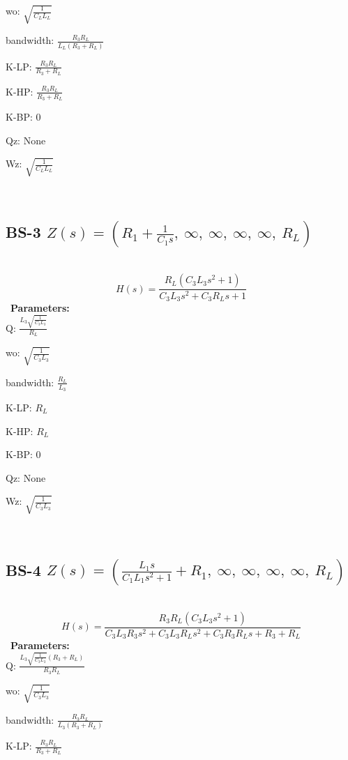 \documentclass{article}
\begin{document}
wo: $\sqrt{\frac{1}{C_{L} L_{L}}}$\ 

bandwidth: $\frac{R_{3} R_{L}}{L_{L} \left(R_{3} + R_{L}\right)}$\ 

K-LP: $\frac{R_{3} R_{L}}{R_{3} + R_{L}}$\ 

K-HP: $\frac{R_{3} R_{L}}{R_{3} + R_{L}}$\ 

K-BP: $0$\ 

Qz: $\text{None}$\ 

Wz: $\sqrt{\frac{1}{C_{L} L_{L}}}$\ 

\ 

\subsection{BS-3 $Z(s) = \left( R_{1} + \frac{1}{C_{1} s}, \  \infty, \  \infty, \  \infty, \  \infty, \  R_{L}\right)$ } \ 
\textbf{\[H(s) = \frac{R_{L} \left(C_{3} L_{3} s^{2} + 1\right)}{C_{3} L_{3} s^{2} + C_{3} R_{L} s + 1}\] } \ 
\textbf{Parameters:}\\ 

Q: $\frac{L_{3} \sqrt{\frac{1}{C_{3} L_{3}}}}{R_{L}}$\ 

wo: $\sqrt{\frac{1}{C_{3} L_{3}}}$\ 

bandwidth: $\frac{R_{L}}{L_{3}}$\ 

K-LP: $R_{L}$\ 

K-HP: $R_{L}$\ 

K-BP: $0$\ 

Qz: $\text{None}$\ 

Wz: $\sqrt{\frac{1}{C_{3} L_{3}}}$\ 

\ 

\subsection{BS-4 $Z(s) = \left( \frac{L_{1} s}{C_{1} L_{1} s^{2} + 1} + R_{1}, \  \infty, \  \infty, \  \infty, \  \infty, \  R_{L}\right)$ } \ 
\textbf{\[H(s) = \frac{R_{3} R_{L} \left(C_{3} L_{3} s^{2} + 1\right)}{C_{3} L_{3} R_{3} s^{2} + C_{3} L_{3} R_{L} s^{2} + C_{3} R_{3} R_{L} s + R_{3} + R_{L}}\] } \ 
\textbf{Parameters:}\\ 

Q: $\frac{L_{3} \sqrt{\frac{1}{C_{3} L_{3}}} \left(R_{3} + R_{L}\right)}{R_{3} R_{L}}$\ 

wo: $\sqrt{\frac{1}{C_{3} L_{3}}}$\ 

bandwidth: $\frac{R_{3} R_{L}}{L_{3} \left(R_{3} + R_{L}\right)}$\ 

K-LP: $\frac{R_{3} R_{L}}{R_{3} + R_{L}}$\ 
\end{document}
